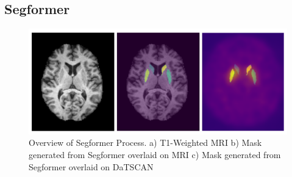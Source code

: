 \subsection{Segformer}
\begin{figure}[h!]
    \centering
    \includegraphics[scale=0.3]{images/3Images.png}
    \caption{Overview of Segformer Process. a) T1-Weighted MRI b) Mask generated from Segformer overlaid on MRI c) Mask generated from Segformer overlaid on DaTSCAN}
    \label{fig:Analysis Process Flowchart}
\end{figure}